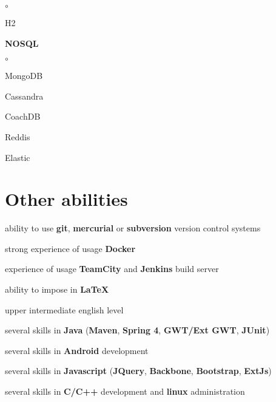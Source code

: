 \documentclass[9pt, a4paper, english]{extarticle}
\begin{document}
\begin{multicols}{3}
\begin {list}{\textbullet}{\itemsep=0mm}
\begin {list}{$\circ$}{}
          \item H2
        \end{list}
      \item \textbf{NOSQL}
        \begin {list}{$\circ$}{}
          \item MongoDB
          \item Cassandra
          \item CoachDB
          \item Reddis
          \item Elastic
        \end{list}
    \end{list}
  \end{multicols}


\section* {Other abilities}
\begin {list}{\textbullet}{\itemsep=0mm}
  \item ability to use \textbf{git}, \textbf{mercurial} or \textbf{subversion} version control systems
  \item strong experience of usage \textbf{Docker}
  \item experience of usage \textbf{TeamCity} and \textbf{Jenkins} build server
  \item ability to impose in \textbf{LaTeX}
  \item upper intermediate english level
  \item several skills in \textbf{Java} (\textbf{Maven}, \textbf{Spring 4}, \textbf{GWT/Ext GWT}, \textbf{JUnit})
  \item several skills in \textbf{Android} development
  \item several skills in \textbf{Javascript} (\textbf{JQuery}, \textbf{Backbone}, \textbf{Bootstrap}, \textbf{ExtJs})
  \item several skills in \textbf{C/C++} development and \textbf{linux} administration
\end {list}
\end{document}
